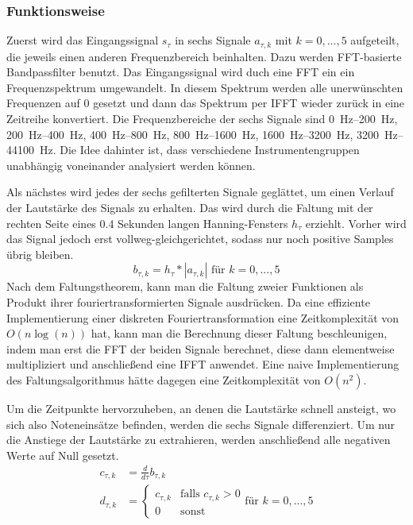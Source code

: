 {{		\subsubsection*{Funktionsweise}
		{
			Zuerst wird das Eingangssignal $s_\tau$ in sechs Signale $a_{\tau, k}$ mit $k = 0, ..., 5$ aufgeteilt,
				die jeweils einen anderen Frequenzbereich beinhalten.
			Dazu werden FFT-basierte Bandpassfilter benutzt.
			Das Eingangssignal wird duch eine FFT ein ein Frequenzspektrum umgewandelt.
			In diesem Spektrum werden alle unerwünschten Frequenzen auf \num{0} gesetzt
				und dann das Spektrum per IFFT wieder zurück in eine Zeitreihe konvertiert.
			Die Frequenzbereiche der sechs Signale sind
				\SIrange{0}{200}{\hertz}, \SIrange{200}{400}{\hertz},
				\SIrange{400}{800}{\hertz}, \SIrange{800}{1600}{\hertz},
				\SIrange{1600}{3200}{\hertz}, \SIrange{3200}{44100}{\hertz}.
			Die Idee dahinter ist,
				dass verschiedene Instrumentengruppen unabhängig voneinander analysiert werden können.

			Als nächstes wird jedes der sechs gefilterten Signale geglättet,
				um einen Verlauf der Lautstärke des Signals zu erhalten.
			Das wird durch die Faltung mit der rechten Seite eines \num{0.4} Sekunden langen Hanning-Fensters $h_\tau$ erziehlt.
			Vorher wird das Signal jedoch erst vollweg-gleichgerichtet,
				sodass nur noch positive Samples übrig bleiben.
			\begin{equation}
				b_{\tau, k} = h_\tau * |a_{\tau, k}| \text{ für } k = 0, ..., 5
			\end{equation}
			Nach dem Faltungstheorem,
				kann man die Faltung zweier Funktionen als Produkt ihrer fouriertransformierten Signale ausdrücken.
			Da eine effiziente Implementierung einer diskreten Fouriertransformation eine Zeitkomplexität von $O(n\log(n))$ hat,
				kann man die Berechnung dieser Faltung beschleunigen,
				indem man erst die FFT der beiden Signale berechnet,
				diese dann elementweise multipliziert
				und anschließend eine IFFT anwendet.
			Eine naive Implementierung des Faltungsalgorithmus hätte dagegen eine Zeitkomplexität von $O(n^2)$.

			Um die Zeitpunkte hervorzuheben,
				an denen die Lautstärke schnell ansteigt,
				wo sich also Noteneinsätze befinden,
				werden die sechs Signale differenziert.
			Um nur die Anstiege der Lautstärke zu extrahieren,
				werden anschließend alle negativen Werte auf Null gesetzt.
			\begin{align}
				c_{\tau, k} &= \frac{d}{d\tau} b_{\tau, k} \\
				d_{\tau, k} &=
					\begin{cases}
						c_{\tau, k} & \text{falls } c_{\tau, k} > 0 \\
						0           & \text{sonst}
					\end{cases}
					\text{für } k = 0, ..., 5
			\end{align}

}}}
